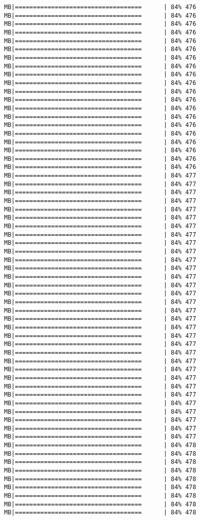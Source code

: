 \documentclass[
]{article}
\begin{document}
\begin{verbatim}
MB|===================================      | 84% 476 MB|===================================      | 84% 476 MB|===================================      | 84% 476 MB|===================================      | 84% 476 MB|===================================      | 84% 476 MB|===================================      | 84% 476 MB|===================================      | 84% 476 MB|===================================      | 84% 476 MB|===================================      | 84% 476 MB|===================================      | 84% 476 MB|===================================      | 84% 476 MB|===================================      | 84% 476 MB|===================================      | 84% 476 MB|===================================      | 84% 476 MB|===================================      | 84% 476 MB|===================================      | 84% 476 MB|===================================      | 84% 476 MB|===================================      | 84% 476 MB|===================================      | 84% 476 MB|===================================      | 84% 476 MB|===================================      | 84% 477 MB|===================================      | 84% 477 MB|===================================      | 84% 477 MB|===================================      | 84% 477 MB|===================================      | 84% 477 MB|===================================      | 84% 477 MB|===================================      | 84% 477 MB|===================================      | 84% 477 MB|===================================      | 84% 477 MB|===================================      | 84% 477 MB|===================================      | 84% 477 MB|===================================      | 84% 477 MB|===================================      | 84% 477 MB|===================================      | 84% 477 MB|===================================      | 84% 477 MB|===================================      | 84% 477 MB|===================================      | 84% 477 MB|===================================      | 84% 477 MB|===================================      | 84% 477 MB|===================================      | 84% 477 MB|===================================      | 84% 477 MB|===================================      | 84% 477 MB|===================================      | 84% 477 MB|===================================      | 84% 477 MB|===================================      | 84% 477 MB|===================================      | 84% 477 MB|===================================      | 84% 477 MB|===================================      | 84% 477 MB|===================================      | 84% 477 MB|===================================      | 84% 477 MB|===================================      | 84% 477 MB|===================================      | 84% 477 MB|===================================      | 84% 478 MB|===================================      | 84% 478 MB|===================================      | 84% 478 MB|===================================      | 84% 478 MB|===================================      | 84% 478 MB|===================================      | 84% 478 MB|===================================      | 84% 478 MB|===================================      | 84% 478 MB|===================================      | 84% 478 
\end{verbatim}
\end{document}
